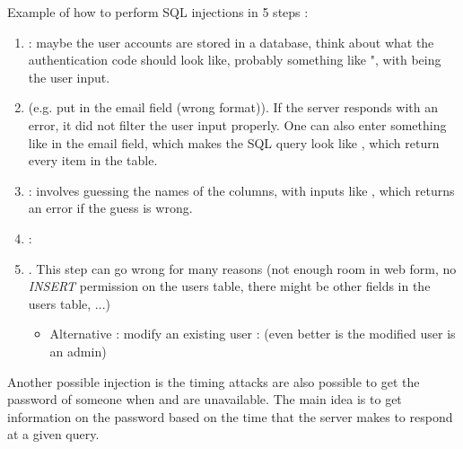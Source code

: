 Example of how to perform SQL injections in 5 steps :
\begin{enumerate}
    \item {} : maybe the user accounts are stored in a database, think about what the authentication code should look like, probably something like  ", with  being the user input.
    \item {} (e.g. put  in the email field (wrong format)). If the server responds with an error, it did not filter the user input properly. One can also enter something like  in the email field, which makes the SQL query look like , which return every item in the table.
    \item {} : involves guessing the names of the columns, with inputs like , which returns an error if the guess is wrong.
    \item {} : 
    \item {} . This step can go wrong for many reasons (not enough room in web form, no \textit{INSERT} permission on the users table, there might be other fields in the users table, ...)
        \begin{itemize}
            \item Alternative : modify an existing user :   (even better is the modified user is an admin)
        \end{itemize}
\end{enumerate}

Another possible injection is the timing attacks are also possible to get the password of someone when  and  are unavailable. The main idea is to get information on the password based on the time that the server makes to respond at a given query.


